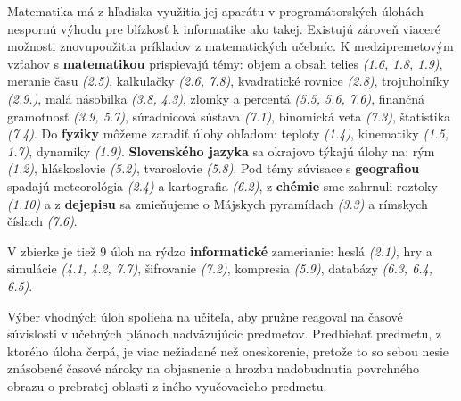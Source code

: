 Matematika má z hľadiska využitia jej aparátu v programátorských úlohách nespornú výhodu pre blízkosť k informatike ako takej. Existujú zároveň viaceré možnosti znovupoužitia príkladov z matematických učebníc. K medzipremetovým vzťahov s \textbf{matematikou} prispievajú témy:
objem a obsah telies \emph{(1.6, 1.8, 1.9)}, meranie času \emph{(2.5)}, kalkulačky \emph{(2.6, 7.8)}, kvadratické rovnice \emph{(2.8)}, trojuholníky \emph{(2.9.)}, malá násobilka \emph{(3.8, 4.3)}, zlomky a percentá \emph{(5.5, 5.6, 7.6)}, finančná gramotnosť \emph{(3.9, 5.7)}, súradnicová sústava \emph{(7.1)}, binomická veta \emph{(7.3)}, štatistika \emph{(7.4)}. Do \textbf{fyziky} môžeme zaradiť úlohy ohľadom: teploty \emph{(1.4)}, kinematiky \emph{(1.5, 1.7)}, dynamiky \emph{(1.9)}. \textbf{Slovenského jazyka} sa okrajovo týkajú úlohy na: rým \emph{(1.2)}, hláskoslovie \emph{(5.2)}, tvaroslovie \emph{(5.8)}. Pod témy súvisace s \textbf{geografiou} spadajú meteorológia \emph{(2.4)} a kartografia \emph{(6.2)}, z \textbf{chémie} sme zahrnuli roztoky \emph{(1.10)} a z \textbf{dejepisu} sa zmieňujeme o Májskych pyramídach \emph{(3.3)} a rímskych číslach \emph{(7.6)}. 

V zbierke je tiež 9 úloh na rýdzo \textbf{informatické} zamerianie: heslá \emph{(2.1)}, hry a simulácie \emph{(4.1, 4.2, 7.7)}, šifrovanie \emph{(7.2)}, kompresia \emph{(5.9)}, databázy \emph{(6.3, 6.4, 6.5)}.

Výber vhodných úloh spolieha na učiteľa, aby pružne reagoval na časové súvislosti v učebných plánoch nadväzujúcic predmetov. Predbiehať predmetu, z ktorého úloha čerpá, je viac nežiadané než oneskorenie, pretože to so sebou nesie znásobené časové nároky na objasnenie a hrozbu nadobudnutia povrchného obrazu o prebratej oblasti z iného vyučovacieho predmetu.
